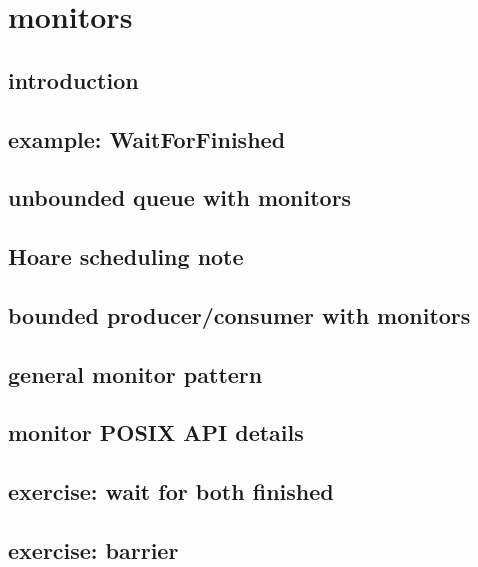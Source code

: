 
\section{monitors}

\subsection{introduction}

\subsection{example: WaitForFinished}


\subsection{unbounded queue with monitors}


\subsection{Hoare scheduling note}


\subsection{bounded producer/consumer with monitors}
 

\subsection{general monitor pattern}


\subsection{monitor POSIX API details}


\subsection{exercise: wait for both finished}


\subsection{exercise: barrier}


